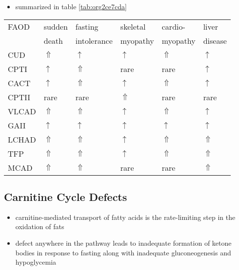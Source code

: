 \documentclass[12pt]{scrartcl}
\begin{document}
\begin{itemize}
\item summarized in table \ref{tab:org2ce7cda}
\end{itemize}
\begin{center}
\begin{tabular}{llllll}
FAOD & sudden & fasting & skeletal & cardio- & liver\\
 & death & intolerance & myopathy & myopathy & disease\\
\hline
CUD & \(\Uparrow\) & \(\uparrow\) & \(\uparrow\) & \(\Uparrow\) & \(\uparrow\)\\
CPTI & \(\uparrow\) & \(\Uparrow\) & rare & rare & \(\uparrow\)\\
CACT & \(\uparrow\) & \(\Uparrow\) & \(\uparrow\) & \(\Uparrow\) & \(\uparrow\)\\
CPTII & rare & rare & \(\Uparrow\) & rare & rare\\
VLCAD & \(\Uparrow\) & \(\Uparrow\) & \(\uparrow\) & \(\Uparrow\) & \(\uparrow\)\\
GAII & \(\uparrow\) & \(\uparrow\) & \(\uparrow\) & \(\uparrow\) & \(\uparrow\)\\
LCHAD & \(\Uparrow\) & \(\Uparrow\) & \(\uparrow\) & \(\Uparrow\) & \(\Uparrow\)\\
TFP & \(\Uparrow\) & \(\Uparrow\) & \(\uparrow\) & \(\Uparrow\) & \(\Uparrow\)\\
MCAD & \(\Uparrow\) & \(\Uparrow\) & rare & rare & \(\Uparrow\)\\
\end{tabular}
\end{center}

\subsection{Carnitine Cycle Defects}
\label{sec:org0bea17e}
\begin{itemize}
\item carnitine-mediated transport of fatty acids is the rate-limiting
step in the oxidation of fats
\item defect anywhere in the pathway leads to inadequate formation of
ketone bodies in response to fasting along with inadequate
gluconeogenesis and hypoglycemia
\end{itemize}
\end{document}
